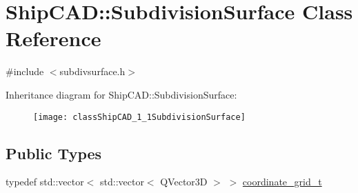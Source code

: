 \hypertarget{classShipCAD_1_1SubdivisionSurface}{}\section{Ship\+C\+AD\+:\+:Subdivision\+Surface Class Reference}
\label{classShipCAD_1_1SubdivisionSurface}


{\ttfamily \#include $<$subdivsurface.\+h$>$}

Inheritance diagram for Ship\+C\+AD\+:\+:Subdivision\+Surface\+:\begin{figure}[H]
\begin{center}
\leavevmode
\texttt{[image: classShipCAD\_1\_1SubdivisionSurface]}
\end{center}
\end{figure}
\subsection*{Public Types}
\begin{DoxyCompactItemize}
\item 
typedef std\+::vector$<$ std\+::vector$<$ Q\+Vector3D $>$ $>$ \hyperlink{classShipCAD_1_1SubdivisionSurface_a8ed657cb7d4cd34662bd2d3e949d3e3b}{coordinate\+\_\+grid\+\_\+t}
\end{DoxyCompactItemize}
